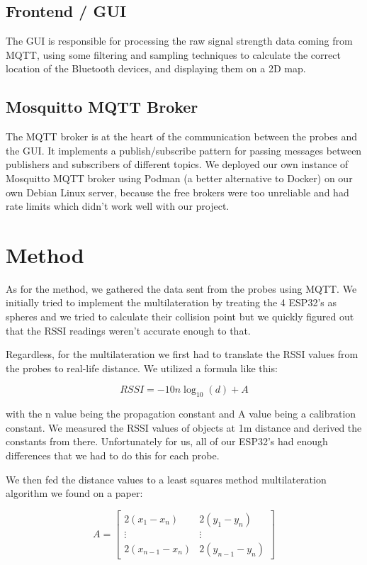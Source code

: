 \documentclass[11pt]{article}
\begin{document}
\subsection{Frontend / GUI}

The GUI is responsible for processing the raw signal strength data coming from MQTT, using some filtering and sampling techniques to calculate the correct location of the Bluetooth devices, and displaying them on a 2D map.

\subsection{Mosquitto MQTT Broker}
The MQTT broker is at the heart of the communication between the probes and the GUI. It implements a publish/subscribe pattern for passing messages between publishers and subscribers of different topics.
We deployed our own instance of Mosquitto MQTT broker using Podman (a better alternative to Docker) on our own Debian Linux server\cite{mosquitto-docker-guide}, because the free brokers were too unreliable and had rate limits which didn't work well with our project.

\section{Method}

As for the method, we gathered the data sent from the probes using MQTT. We initially tried to implement the multilateration by treating the 4 ESP32's as spheres and we tried to calculate their collision point but we quickly figured out that the RSSI readings weren't accurate enough to that.

Regardless, for the multilateration we first had to translate the RSSI values from the probes to real-life distance. We utilized a formula like this:

\[ RSSI = -10n\log_{10}(d) + A \]

with the n value being the propagation constant and A value being a calibration constant. We measured the RSSI values of objects at 1m distance and derived the constants from there. Unfortunately for us, all of our ESP32's had enough differences that we had to do this for each probe.

We then fed the distance values to a least squares method multilateration algorithm we found on a paper\cite{robesaat17}:

\[
A = 
\begin{bmatrix}
2(x_1 - x_n) & 2(y_1 - y_n) \\
\vdots & \vdots \\
2(x_{n-1} - x_n) & 2(y_{n-1} - y_n)
\end{bmatrix}
\]
\end{document}
